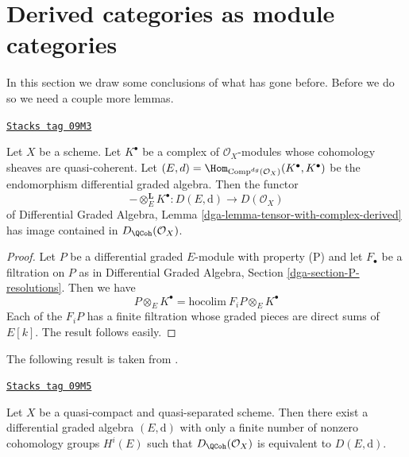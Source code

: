 \section{Derived categories as module categories}
\label{perfect-section-derived-is-dga}
In this section we draw some conclusions of what has gone before.
Before we do so we need a couple more lemmas.

\begin{lemma}
\label{perfect-lemma-tensor-with-QCoh-complex}
\href{https://stacks.math.columbia.edu/tag/09M3}{\texttt{Stacks tag 09M3}}

Let $X$ be a scheme. Let $K^\bullet$ be a complex of $\mathcal{O}_X$-modules
whose cohomology sheaves are quasi-coherent. Let
$(E, d) = \Hom_{\text{Comp}^{dg}(\mathcal{O}_X)}(K^\bullet, K^\bullet)$
be the endomorphism differential graded algebra. Then the functor
$$
- \otimes_E^\mathbf{L} K^\bullet :
D(E, \text{d}) \longrightarrow D(\mathcal{O}_X)
$$
of
Differential Graded Algebra, Lemma
\ref{dga-lemma-tensor-with-complex-derived}
has image contained in $D_\QCoh(\mathcal{O}_X)$.
\end{lemma}

\begin{proof}
Let $P$ be a differential graded $E$-module with property (P)
and let $F_\bullet$ be a filtration on $P$ as in
Differential Graded Algebra, Section \ref{dga-section-P-resolutions}.
Then we have
$$
P \otimes_E K^\bullet = \text{hocolim}\ F_iP \otimes_E K^\bullet
$$
Each of the $F_iP$ has a finite filtration whose graded pieces
are direct sums of $E[k]$. The result follows easily.
\end{proof}

The following result is taken from \cite{BvdB}.

\begin{theorem}
\label{perfect-theorem-DQCoh-is-Ddga}
\href{https://stacks.math.columbia.edu/tag/09M5}{\texttt{Stacks tag 09M5}}

Let $X$ be a quasi-compact and quasi-separated scheme.
Then there exist a differential graded algebra $(E, \text{d})$
with only a finite number of nonzero cohomology groups $H^i(E)$
such that $D_\QCoh(\mathcal{O}_X)$ is equivalent
to $D(E, \text{d})$.
\end{theorem}

